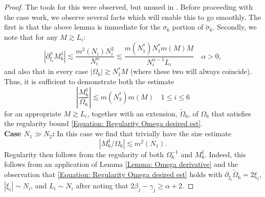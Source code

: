 \documentclass[12pt, letterpaper]{amsart}
\begin{document}
\begin{proof}
    The tools for this were observed, but unused in \cite{schippa2024improved}. Before proceeding with the case work, we observe several facts which will enable this to go smoothly. The first is that the above lemma is immediate for the $\sigma_6$ portion of $\tilde{\sigma}_6$. Secondly, we note that for any $M \gtrsim L_i$:
    \[
    |\partial_{\xi_i}^{\alpha}M_6^1|\lesssim \frac{m^2(N_i)N_i^2}{N_i^{\alpha}}\lesssim \frac{m(N_1^*)N_1^*m(M)M}{N_i^{\alpha-1}L_i}\quad \alpha > 0,
    \]
    and also that in every case $|\Omega_6|\gtrsim N_1^*M$ (where these two will always coincide). Thus, it is sufficient to demonstrate both the estimate
    \[
    \left|\frac{M_6^1}{\Omega_6}\right|\lesssim m(N_3^*)m(M)\quad 1\leq i\leq 6
    \]
    for an appropriate $M\gtrsim L_i$, together with an extension, $\tilde{\Omega}_6$, of $\Omega_6$ that satisfies the regularity bound \eqref{Equation: Regularity Omega desired est}.\\
    
    \textbf{Case $N_1\gg N_2$:} In this case we find that trivially have the size estimate 
    \[
    |M^1_6/\Omega_6|\lesssim m^2(N_1).
    \]
    Regularity then follows from the regularity of both $\Omega_6^{-1}$ and $M^1_6$. Indeed, this follows from an application of Lemma \ref{Lemma: Omega derivative} and the observation that \eqref{Equation: Regularity Omega desired est} holds with $\partial_{\xi_i}\tilde{\Omega}_6 = 2\xi_i$, $|\xi_i|\sim N_i$, and $L_i\sim N_i$ after noting that $2\beta_j-\gamma_j\geq \alpha+2$.


\end{proof}
\end{document}
